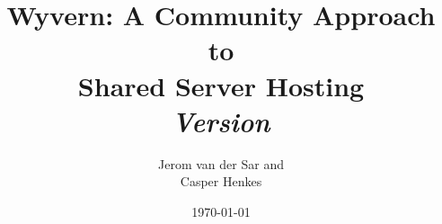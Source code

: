 \documentclass[a4paper]{article}
\title{
    Wyvern: A Community Approach to\\
    Shared Server Hosting\\
    \vspace{10px}
    \large \textit{Version \versionnumber}
}
\author{
    Jerom van der Sar and\\
    Casper Henkes
}
\date{\today}
\begin{document}
\begin{titlepage}
    \maketitle
\end{titlepage}


\newpage

\tableofcontents
\newpage
{}




%


\newpage
\appendix
\appendixpage


\end{document}
